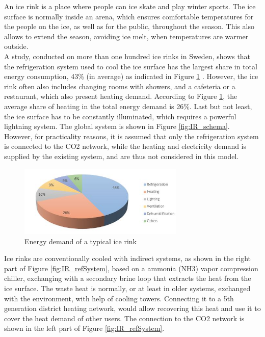 \documentclass{article}
\begin{document}
An ice rink is a place where people can ice skate and play winter sports. The ice surface is normally inside an arena, which ensures comfortable temperatures for the people on the ice, as well as for the public, throughout the season. This also allows to extend the season, avoiding ice melt, when temperatures are warmer outside.\\

A study, conducted on more than one hundred ice rinks in Sweden, shows that the refrigeration system used to cool the ice surface has the largest share in total energy consumption, 43\% (in average) as indicated in Figure \ref{fig:IR_energyDemand} \cite{karampourMEASUREMENTMODELLINGICE}. 
However, the ice rink often also includes changing rooms with showers, and a cafeteria or a restaurant, which also present heating demand. According to Figure \ref{fig:IR_energyDemand}, the average share of heating in the total energy demand is 26\%.
Last but not least, the ice surface has to be constantly illuminated, which requires a powerful lightning system. The global system is shown in Figure \ref{fig:IR_schema}.\\

However, for practicality reasons, it is assumed that only the refrigeration system is connected to the CO2 network, while the heating and electricity demand is supplied by the existing system, and are thus not considered in this model.

\begin{figure}[htp]
	\centering
	\includegraphics[width=0.7\textwidth]{IR_energyDemand.JPG}
	\caption{Energy demand of a typical ice rink \cite{karampourMEASUREMENTMODELLINGICE}}
	\label{fig:IR_energyDemand}
\end{figure}

Ice rinks are conventionally cooled with indirect systems, as shown in the right part of Figure \ref{fig:IR_refSystem}, based on a ammonia (NH3) vapor compression chiller, exchanging with a secondary brine loop that extracts the heat from the ice surface. The waste heat is normally, or at least in older systems, exchanged with the environment, with help of cooling towers. Connecting it to a 5th generation district heating network, would allow recovering this heat and use it to cover the heat demand of other users. The connection to the CO2 network is shown in the left part of Figure \ref{fig:IR_refSystem}.\\
\end{document}
